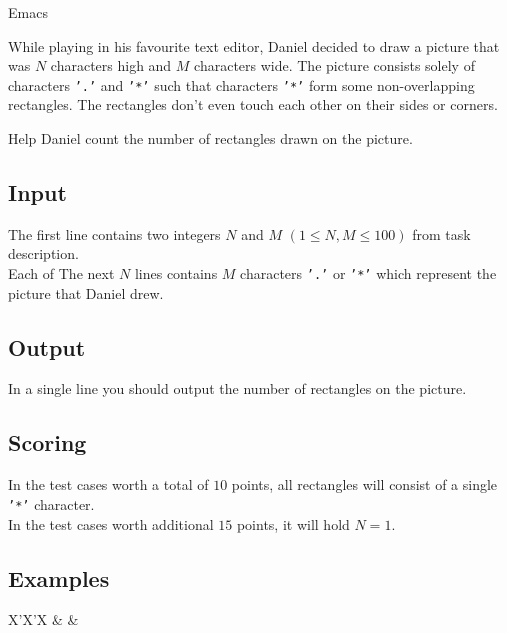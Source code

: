 \begin{statement}[
  problempoints=50,
  timelimit=1 second,
  memorylimit=512 MiB,
]{Emacs}


While playing in his favourite text editor, Daniel decided to draw a picture
that was $N$ characters high and $M$ characters wide. The picture consists
solely of characters \texttt{'.'} and \texttt{'*'} such that characters
\texttt{'*'} form some non-overlapping rectangles. The rectangles don't even
touch each other on their sides or corners.

Help Daniel count the number of rectangles drawn on the picture.

\subsection*{Input}
The first line contains two integers $N$ and $M$ $(1 \le N, M \le 100)$ from
task description. \\
Each of The next $N$ lines contains $M$ characters \texttt{'.'} or
\texttt{'*'} which represent the picture that Daniel drew.

\subsection*{Output}
In a single line you should output the number of rectangles on the picture.

\subsection*{Scoring}
In the test cases worth a total of $10$ points, all rectangles will consist
of a single \texttt{'*'} character.\\
In the test cases worth additional $15$ points, it will hold $N = 1$.

\subsection*{Examples}
\begin{tabularx}{\textwidth}{X'X'X}
 &
 &
\end{tabularx}

\end{statement}

